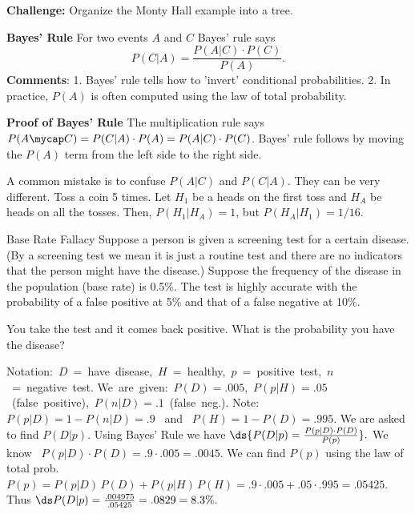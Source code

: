 \medskip

\textbf{Challenge:} Organize the Monty Hall example into a tree.

\cont

\textbf{Bayes' Rule}
For two events $A$ and $C$ Bayes' rule says
\begin{equation}\label{bayes}
  P(C|A) = \frac{P(A|C)\cdot P(C)}{P(A)}.
\end{equation}
\textbf{Comments}: 1. Bayes' rule tells how to 'invert' conditional probabilities.
2. In practice, $P(A)$ is often computed using the law of total probability.

\textbf{Proof of Bayes' Rule} 
The multiplication rule says
$P(A\mycap C) = P(C|A)\cdot P(A) = P(A|C)\cdot P(C)$. Bayes' rule follows
by moving the $P(A)$ term from the left side to the right side.

\medskip

A common mistake is to confuse $P(A|C)$ and $P(C|A)$.
They can be very different.
 Toss a coin 5 times. Let $H_1$ be a heads on the first toss
and $H_A$ be heads on all the tosses. Then,
$P(H_1|H_A) = 1$, but $P(H_A|H_1) = 1/16.$

\medskip

 Base Rate Fallacy
Suppose a person is given a screening test for a certain disease.
(By a screening test we mean it is just a routine test and there are
no indicators that the person might have the disease.)
Suppose the frequency of the disease in the population (base rate)
 is 0.5\%. The test is highly accurate
with the probability of a false positive at 5\% and that of a false negative
at 10\%.

You take the test and it comes back positive. What is the probability you
have the disease?

\mbox{\ans Notation: $D$ = have disease, $H$ = healthy, $p$ = positive test,
$n$ = negative test.}
\mbox{We are given: $P(D) = .005$, $P(p|H) = .05$ (false positive), 
$P(n|D) = .1$ (false neg.).}
Note: \,  $P(p|D) = 1 - P(n|D) = .9$ \, and \, $P(H) = 1 - P(D) = .995$.
We are asked to find $P(D|p)$. Using Bayes' Rule we have
$\ds{ P(D|p) = \frac{P(p|D)\cdot P(D)}{P(p)}}.$
We know \,  $P(p|D)\cdot P(D) = .9\cdot.005 = .0045$. 
We can find $P(p)$ using the law of total prob.
$P(p) = P(p|D)\,P(D) + P(p|H)\,P(H) = .9\cdot.005 + .05\cdot .995 = .05425$.
Thus $\ds{P(D|p) = \frac{.004975}{.05425} = .0829 = 8.3\%.}$


